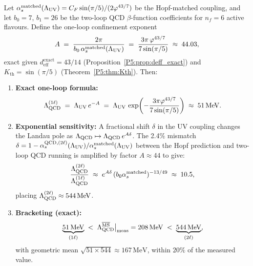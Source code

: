 \begin{proposition}
\label{P5:prop:lqcd_bracket}
Let $\alpha_s^{\mathrm{matched}}(\Lambda_{\mathrm{UV}})=C_F\sin(\pi/5)/(2\varphi^{43/7})$
be the Hopf-matched coupling, and let $b_0=7$, $b_1=26$ be the
two-loop QCD $\beta$-function coefficients for $n_f=6$ active flavours.
Define the one-loop confinement exponent
\begin{equation}
  A \;=\; \frac{2\pi}{b_0\,\alpha_s^{\mathrm{matched}}(\Lambda_{\mathrm{UV}})}
  \;=\; \frac{3\pi\,\varphi^{43/7}}{7\sin(\pi/5)}
  \;\approx\; 44.03,
  \label{P5:eq:A_exponent}
\end{equation}
exact given $d_{\mathrm{eff}}^{\mathrm{exact}}=43/14$
(Proposition~\ref{P5:prop:deff_exact}) and $K_{\mathrm{th}}=\sin(\pi/5)$
(Theorem~\ref{P5:thm:Kth}).
Then:
\begin{enumerate}[label=(\roman*)]
\item \textbf{Exact one-loop formula:}
\begin{equation}
  \Lambda_{\mathrm{QCD}}^{(1\ell)}
  \;=\; \Lambda_{\mathrm{UV}}\,e^{-A}
  \;=\; \Lambda_{\mathrm{UV}}\,\exp\!\left(-\frac{3\pi\varphi^{43/7}}{7\sin(\pi/5)}\right)
  \;\approx\; 51\,\mathrm{MeV}.
  \label{P5:eq:lqcd_1l_exact}
\end{equation}
\item \textbf{Exponential sensitivity:}
A fractional shift $\delta$ in the UV coupling changes the Landau pole
as $\Lambda_{\mathrm{QCD}} \mapsto \Lambda_{\mathrm{QCD}}\,e^{A\delta}$.  The 2.4\% mismatch
$\delta = 1 - \alpha_s^{\mathrm{QCD},(2\ell)}(\Lambda_{\mathrm{UV}})/\alpha_s^{\mathrm{matched}}(\Lambda_{\mathrm{UV}})$
between the Hopf prediction and two-loop QCD running
is amplified by factor $A\approx44$ to give:
\begin{equation}
  \frac{\Lambda_{\mathrm{QCD}}^{(2\ell)}}{\Lambda_{\mathrm{QCD}}^{(1\ell)}}
  \;\approx\; e^{A\delta}\,(b_0\alpha_s^{\mathrm{matched}})^{-13/49}
  \;\approx\; 10.5,
  \label{P5:eq:loop_ratio}
\end{equation}
placing $\Lambda_{\mathrm{QCD}}^{(2\ell)}\approx544\,\mathrm{MeV}$.
\item \textbf{Bracketing (exact):}
\begin{equation}
  \underbrace{51\,\mathrm{MeV}}_{(1\ell)}
  \;<\; \Lambda_{\mathrm{QCD}}^{\overline{\mathrm{MS}}}\big|_{\mathrm{meas}} = 208\,\mathrm{MeV}
  \;<\; \underbrace{544\,\mathrm{MeV}}_{(2\ell)},
  \label{P5:eq:LQCD_bracket}
\end{equation}
with geometric mean $\sqrt{51\times544}\approx167\,\mathrm{MeV}$,
within $20\%$ of the measured value.
\end{enumerate}
\end{proposition}

